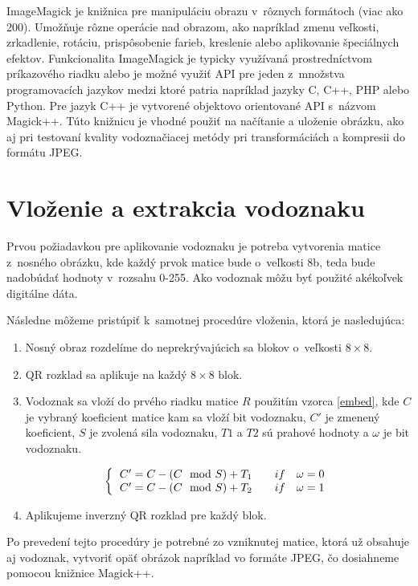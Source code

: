 ImageMagick je knižnica pre manipuláciu obrazu v~rôznych formátoch (viac ako 200). Umožňuje rôzne operácie nad obrazom, ako napríklad zmenu veľkosti, zrkadlenie, rotáciu, prispôsobenie farieb, kreslenie alebo aplikovanie špeciálnych efektov. Funkcionalita ImageMagick je typicky využívaná prostredníctvom príkazového riadku alebo je možné využiť API pre jeden z~množstva programovacích jazykov medzi ktoré patria napríklad jazyky C, C++, PHP alebo Python. Pre jazyk C++ je vytvorené objektovo orientované API s~názvom Magick++. Túto knižnicu je vhodné použiť na načítanie a uloženie obrázku, ako aj pri testovaní kvality vodoznačiacej metódy pri transformáciách a kompresii do formátu JPEG.

\section{Vloženie a extrakcia vodoznaku} \label{vlozenie}
Prvou požiadavkou pre aplikovanie vodoznaku je potreba vytvorenia matice z~nosného obrázku, kde každý prvok matice bude o~veľkosti 8b, teda bude nadobúdať hodnoty v~rozsahu 0-255. Ako vodoznak môžu byť použité akékoľvek digitálne dáta.

Následne môžeme pristúpiť k~samotnej procedúre vloženia, ktorá je nasledujúca:
\begin{enumerate}
\item Nosný obraz rozdelíme do neprekrývajúcich sa blokov o~veľkosti $8\times8$.
\item QR rozklad sa aplikuje na každý $8\times8$ blok.
\item Vodoznak sa vloží do prvého riadku matice $R$ použitím vzorca \ref{embed}, kde $C$ je vybraný koeficient matice kam sa vloží bit vodoznaku, $C'$ je zmenený koeficient, $S$ je zvolená sila vodoznaku, $T1$ a $T2$ sú prahové hodnoty a $\omega$ je bit vodoznaku.

\begin{equation} \label{embed}
\left \{
  \begin{tabular}{c}
  $C' = C - (C\mod S) + T_1 \qquad if \quad \omega = 0$ \\
  $C' = C - (C\mod S) + T_2 \qquad if \quad \omega = 1$
  \end{tabular}
\right.
\end{equation}
\item Aplikujeme inverzný QR rozklad pre každý blok.
\end{enumerate}

Po prevedení tejto procedúry je potrebné zo vzniknutej matice, ktorá už obsahuje aj vodoznak, vytvoriť opäť obrázok napríklad vo formáte JPEG, čo dosiahneme pomocou knižnice Magick++.

